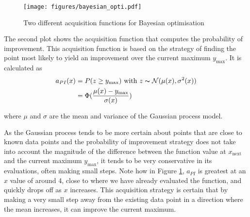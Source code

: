 \documentclass[a4paper,12pt,twoside,openright]{report}
\begin{document}
\begin{figure}
\centering
  \texttt{[image: figures/bayesian\_opti.pdf]}
  \caption{Two different acquisition functions for Bayesian optimisation}
  \label{bayesianopti}
\end{figure}

The second plot shows the acquisition function that computes the probability of improvement. This acquisition function is based on the strategy of finding the point most likely to yield an improvement over the current maximum $y_{\text{max}}$. It is calculated as
\begin{align}
a_{PI}(x) &= P(z \geq y_{\text{max}}) \text{\ with\ } z \thicksim \mathcal{N}(\mu(x),\sigma^2(x))\label{eq:pi_equation}\\
&=\Phi(\frac{\mu(x) - y_{\text{max}}}{\sigma(x)})
\end{align}

where $\mu$ and $\sigma$ are the mean and variance of the Gaussian process model.

As the Gaussian process tends to be more certain about points that are close to known data points and the probability of improvement strategy does not take into account the magnitude of the difference between the function value at $x_{\text{next}}$ and the current maximum $y_{\text{max}}$, it tends to be very conservative in its evaluations, often making small steps. Note how in Figure \ref{bayesianopti}, $a_{PI}$ is greatest at an $x$ value of around 4, close to where we have already evaluated the function, and quickly drops off as $x$ increases. This acquisition strategy is certain that by making a very small step away from the existing data point in a direction where the mean increases, it can improve the current maximum.
\end{document}
